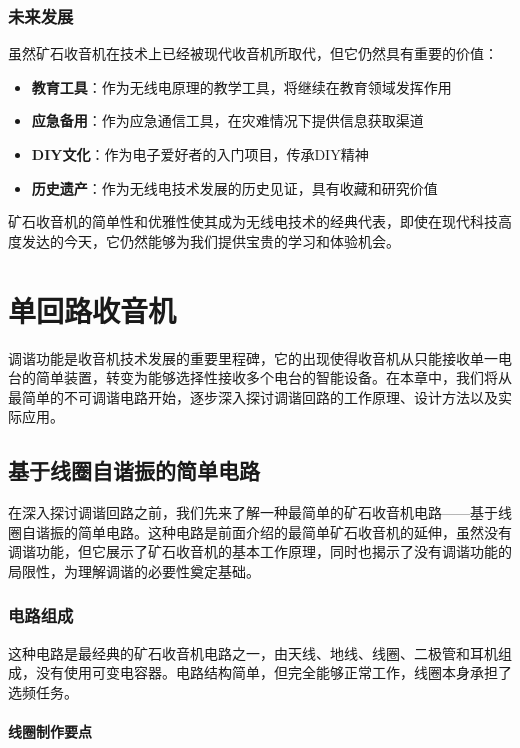 \documentclass[12pt,UTF8]{ctexbook}
\begin{document}
\subsection{未来发展}

虽然矿石收音机在技术上已经被现代收音机所取代，但它仍然具有重要的价值：

\begin{itemize}
  \item \textbf{教育工具}：作为无线电原理的教学工具，将继续在教育领域发挥作用
  \item \textbf{应急备用}：作为应急通信工具，在灾难情况下提供信息获取渠道
  \item \textbf{DIY文化}：作为电子爱好者的入门项目，传承DIY精神
  \item \textbf{历史遗产}：作为无线电技术发展的历史见证，具有收藏和研究价值
\end{itemize}

矿石收音机的简单性和优雅性使其成为无线电技术的经典代表，即使在现代科技高度发达的今天，它仍然能够为我们提供宝贵的学习和体验机会。

\chapter{单回路收音机}

调谐功能是收音机技术发展的重要里程碑，它的出现使得收音机从只能接收单一电台的简单装置，转变为能够选择性接收多个电台的智能设备。在本章中，我们将从最简单的不可调谐电路开始，逐步深入探讨调谐回路的工作原理、设计方法以及实际应用。

\section{基于线圈自谐振的简单电路}

在深入探讨调谐回路之前，我们先来了解一种最简单的矿石收音机电路——基于线圈自谐振的简单电路。这种电路是前面介绍的最简单矿石收音机的延伸，虽然没有调谐功能，但它展示了矿石收音机的基本工作原理，同时也揭示了没有调谐功能的局限性，为理解调谐的必要性奠定基础。

\subsection{电路组成}

这种电路是最经典的矿石收音机电路之一，由天线、地线、线圈、二极管和耳机组成，没有使用可变电容器。电路结构简单，但完全能够正常工作，线圈本身承担了选频任务。

\subsubsection{线圈制作要点}
\end{document}
